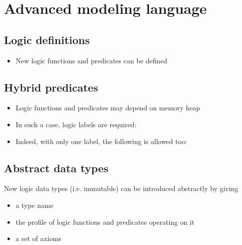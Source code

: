 \documentclass[a4paper,11pt,twoside,openright]{report}
\begin{document}
\section{Advanced modeling language}
\label{sec:logicspec}

\subsection{Logic definitions}

  \begin{itemize}
  \item New logic functions and predicates can be defined 
  \end{itemize}

\subsection{Hybrid predicates}
\label{sec:logicalstates}

  \begin{itemize}
  \item Logic functions and predicates may depend on memory heap
  \item In such a case, logic labels are required:
  \item Indeed, with only one label, the following is allowed too:
  \end{itemize}

\subsection{Abstract data types}

  New logic data types (i.e. immutable) can be introduced abstractly
  by giving
  \begin{itemize}
  \item a type name
  \item the profile of logic functions and predicates operating on it
  \item a set of axioms 
  \end{itemize}



\end{document}

